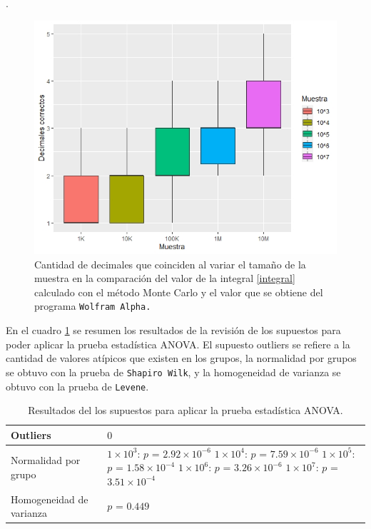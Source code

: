 \documentclass{article}
\begin{document}
\newpage
.
\bigskip

\begin{figure} [h!]%
    \centering
    \includegraphics[width=150mm]{Figura1.jpeg} %
    \caption{Cantidad de decimales que coinciden al variar el tamaño de la muestra en la comparación del valor de la integral \eqref{integral} calculado con el método Monte Carlo y el valor que se obtiene del programa \texttt{Wolfram Alpha.}}
    \label{Figura1}
\end{figure}

En el cuadro \ref{Cuadro1} se  resumen los resultados de la revisión de los supuestos para poder aplicar la prueba estadística ANOVA. El supuesto outliers se refiere a la cantidad de valores atípicos que existen en los grupos, la normalidad por grupos se obtuvo con la prueba de \texttt{Shapiro Wilk}, y la homogeneidad de varianza se obtuvo con la prueba de \texttt{Levene}.

\begin{table}[ht]
\centering
\caption{Resultados del los supuestos para aplicar la prueba estadística ANOVA.}
\smallskip

\begin{tabular}{ |p{2.1cm}|p{3.5cm}|}
 \hline
 Outliers & $0$ \\
 \hline
 Normalidad por grupo & $1\times 10^{3}$: $p$ = $2.92\times 10^{-6}$ $1\times 10^{4}$: $p$ = $7.59\times 10^{-6}$ $1\times 10^{5}$: $p$ = $1.58\times 10^{-4}$ $1\times 10^{6}$: $p$ = $3.26\times 10^{-6}$ $1\times 10^{7}$: $p$ = $3.51\times 10^{-4}$\\
 \hline
 Homogeneidad de varianza & $p$ = $0.449$ \\
 \hline
\end{tabular}
\label{Cuadro1}
\end{table}
\end{document}
